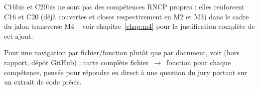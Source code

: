 C16bis et C20bis ne sont pas des compétences RNCP propres : elles
renforcent C16 et C20 (déjà couvertes et closes respectivement en M2
et M3) dans le cadre du jalon transverse M4 -- voir
chapitre~\ref{chap:m4} pour la justification complète de cet ajout.

Pour une navigation par fichier/fonction plutôt que par document,
voir  (hors
rapport, dépôt GitHub) : carte complète fichier~$\rightarrow$~fonction
pour chaque compétence, pensée pour répondre en direct à une question
du jury portant sur un extrait de code précis.

